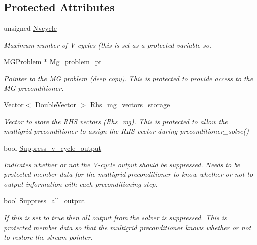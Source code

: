 \subsection*{Protected Attributes}
\begin{DoxyCompactItemize}
\item 
unsigned \hyperlink{classoomph_1_1MGSolver_ab3d4af8ea6d7bc8d0a6f528cb669e920}{Nvcycle}
\begin{DoxyCompactList}\small\item\em Maximum number of V-\/cycles (this is set as a protected variable so. \end{DoxyCompactList}\item 
\hyperlink{classoomph_1_1MGProblem}{M\+G\+Problem} $\ast$ \hyperlink{classoomph_1_1MGSolver_af48a7c051423b2a5d27b19aa8adb996a}{Mg\+\_\+problem\+\_\+pt}
\begin{DoxyCompactList}\small\item\em Pointer to the MG problem (deep copy). This is protected to provide access to the MG preconditioner. \end{DoxyCompactList}\item 
\hyperlink{classoomph_1_1Vector}{Vector}$<$ \hyperlink{classoomph_1_1DoubleVector}{Double\+Vector} $>$ \hyperlink{classoomph_1_1MGSolver_a18889939fb1256a86e5862c1e5ecbd31}{Rhs\+\_\+mg\+\_\+vectors\+\_\+storage}
\begin{DoxyCompactList}\small\item\em \hyperlink{classoomph_1_1Vector}{Vector} to store the R\+HS vectors (Rhs\+\_\+mg). This is protected to allow the multigrid preconditioner to assign the R\+HS vector during preconditioner\+\_\+solve() \end{DoxyCompactList}\item 
bool \hyperlink{classoomph_1_1MGSolver_ac533f8f9a9f6efaf5b3c63fbdd09e0d1}{Suppress\+\_\+v\+\_\+cycle\+\_\+output}
\begin{DoxyCompactList}\small\item\em Indicates whether or not the V-\/cycle output should be suppressed. Needs to be protected member data for the multigrid preconditioner to know whether or not to output information with each preconditioning step. \end{DoxyCompactList}\item 
bool \hyperlink{classoomph_1_1MGSolver_a0cd765279d8e8f3929cc253fd00ba9eb}{Suppress\+\_\+all\+\_\+output}
\begin{DoxyCompactList}\small\item\em If this is set to true then all output from the solver is suppressed. This is protected member data so that the multigrid preconditioner knows whether or not to restore the stream pointer. \end{DoxyCompactList}\item 

\end{DoxyCompactItemize}
